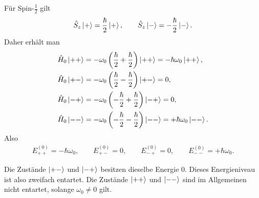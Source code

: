\documentclass[11pt,a4paper]{scrartcl}
\newcommand{\op}[1]{\hat{#1}}
\begin{document}
\begin{enumerate}[label=(\alph*)]
\begin{calculationbox}
            \begin{calculationbox}[title=Energieeigenwerte von $\op H_0$]
                Für Spin-$\frac12$ gilt
                \begin{align*}
                    \op S_z\ket{+}=\frac{\hbar}{2}\ket{+},
                    \qquad
                    \op S_z\ket{-}=-\frac{\hbar}{2}\ket{-}.
                \end{align*}
                Daher erhält man
                \begin{align*}
                    \op H_0\ket{++}
                    &=
                    -\omega_0\left(\frac{\hbar}{2}+\frac{\hbar}{2}\right)\ket{++}
                    =
                    -\hbar\omega_0\ket{++},\\
                    \op H_0\ket{+-}
                    &=
                    -\omega_0\left(\frac{\hbar}{2}-\frac{\hbar}{2}\right)\ket{+-}
                    =
                    0,\\
                    \op H_0\ket{-+}
                    &=
                    -\omega_0\left(-\frac{\hbar}{2}+\frac{\hbar}{2}\right)\ket{-+}
                    =
                    0,\\
                    \op H_0\ket{--}
                    &=
                    -\omega_0\left(-\frac{\hbar}{2}-\frac{\hbar}{2}\right)\ket{--}
                    =
                    +\hbar\omega_0\ket{--}.
                \end{align*}
                Also
                \begin{align*}
                    \boxed{E_{++}^{(0)}=-\hbar\omega_0,}
                    \qquad
                    \boxed{E_{+-}^{(0)}=0,}
                    \qquad
                    \boxed{E_{-+}^{(0)}=0,}
                    \qquad
                    \boxed{E_{--}^{(0)}=+\hbar\omega_0.}
                \end{align*}
            \end{calculationbox}

            \begin{solutionbox}
                Die Zustände $\ket{+-}$ und $\ket{-+}$ besitzen dieselbe Energie $0$. Dieses Energieniveau ist also zweifach entartet. Die Zustände $\ket{++}$ und $\ket{--}$ sind im Allgemeinen nicht entartet, solange $\omega_0\neq0$ gilt.
            \end{solutionbox}
        \end{calculationbox}


\end{enumerate}
\end{document}
